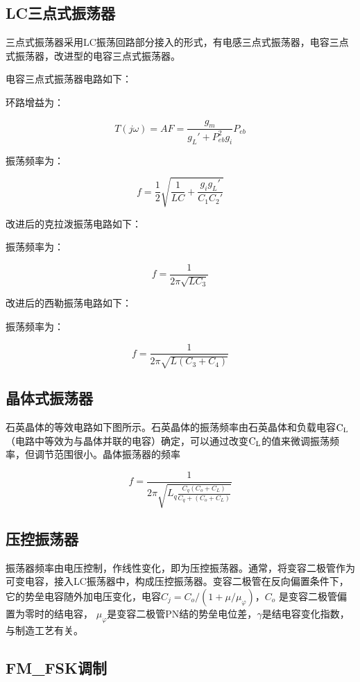 \documentclass{../source/Experiment}
\begin{document}
        \subsection{LC三点式振荡器}

        三点式振荡器采用LC振荡回路部分接入的形式，有电感三点式振荡器，电容三点式振荡器，改进型的电容三点式振荡器。

        电容三点式振荡器电路如下：

        环路增益为：

        $$
        T(j\omega) = AF = \frac{g_m}{g_L' + P_{eb}^2g_i}P_{eb}
        $$

        振荡频率为：

        $$
        f = \frac{1}{2}\sqrt{\frac{1}{LC} + \frac{g_ig_L'}{C_1C_2'}}
        $$

        改进后的克拉泼振荡电路如下：

        振荡频率为：

        $$
        f = \frac{1}{2\pi\sqrt{LC_3}}
        $$

        改进后的西勒振荡电路如下：

        振荡频率为：

        $$
        f = \frac{1}{2\pi\sqrt{L(C_3+C_4)}}
        $$


        \subsection{晶体式振荡器}
        石英晶体的等效电路如下图所示。石英晶体的振荡频率由石英晶体和负载电容$\rm C_L$（电路中等效为与晶体并联的电容）确定，可以通过改变$\rm C_L$的值来微调振荡频率，但调节范围很小。晶体振荡器的频率

        $$
        f = \frac{1}{2\pi\sqrt{L_q\frac{C_q(C_o+C_L)}{C_q+(C_o+C_L)}}}
        $$

        \subsection{压控振荡器}
    振荡器频率由电压控制，作线性变化，即为压控振荡器。通常，将变容二极管作为可变电容，接入LC振荡器中，构成压控振荡器。变容二极管在反向偏置条件下，它的势垒电容随外加电压变化，电容$C_j = C_o/(1+\mu/\mu_{\varphi})$，$C_o$ 是变容二极管偏置为零时的结电容， $\mu_\varphi$是变容二极管PN结的势垒电位差，$\gamma$是结电容变化指数，与制造工艺有关。

        \subsection{FM\_FSK调制}
\end{document}
